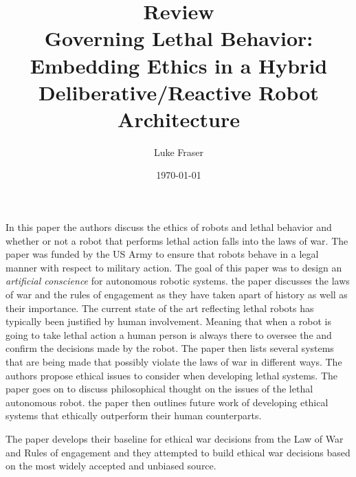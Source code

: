 \documentclass{article}
\begin{document}
\title{{\large Review} \\ Governing Lethal Behavior: Embedding Ethics in a Hybrid Deliberative/Reactive Robot Architecture}
\author{Luke Fraser}
\date{\today}
\maketitle

\begingroup
\renewcommand{\section}[2]{}


\endgroup

\section*{Summary}
In this paper the authors discuss the ethics of robots and lethal behavior and whether or not a robot that performs lethal action falls into the laws of war. The paper was funded by the US Army to ensure that robots behave in a legal manner with respect to military action. The goal of this paper was to design an \emph{artificial conscience} for autonomous robotic systems. the paper discusses the laws of war and the rules of engagement as they have taken apart of history as well as their importance. The current state of the art reflecting lethal robots has typically been justified by human involvement. Meaning that when a robot is going to take lethal action a human person is always there to oversee the and confirm the decisions made by the robot. The paper then lists several systems that are being made that possibly violate the laws of war in different ways. The authors propose ethical issues to consider when developing lethal systems. The paper goes on to discuss philosophical thought on the issues of the lethal autonomous robot. the paper then outlines future work of developing ethical systems that ethically outperform their human counterparts.
\section*{Strengths}
The paper develops their baseline for ethical war decisions from the Law of War and Rules of engagement and they attempted to build ethical war decisions based on the most widely accepted and unbiased source.
\end{document}
